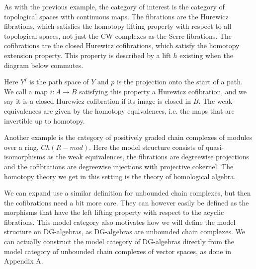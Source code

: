 \begin{example}
As with the previous example, the category of interest is the category of topological spaces with continuous maps. The fibrations are the Hurewicz fibrations, which satisfies the homotopy lifting property with respect to all topological spaces, not just the CW complexes as the Serre fibrations. The cofibrations are the closed Hurewicz cofibrations, which satisfy the homotopy extension property. This property is described by a lift $h$ existing when the diagram below commutes.

\begin{center}
\end{center}

Here $Y^I$ is the path space of $Y$ and $p$ is the projection onto the start of a path. We call a map $i:A\longrightarrow B$ satisfying this property a Hurewicz cofibration, and we say it is a closed Hurewicz cofibration if its image is closed in $B$. The weak equivalences are given by the homotopy equivalences, i.e. the maps that are invertible up to homotopy.  
\end{example}

\begin{example}
Another example is the category of positively graded chain complexes of modules over a ring, $Ch(R-mod)$. Here the model structure consists of quasi-isomorphisms as the weak equivalences, the fibrations are degreewise projections and the cofibrations are degreewise injections with projective cokernel. The homotopy theory we get in this setting is the theory of homological algebra. 

We can expand use a similar definition for unbounded chain complexes, but then the cofibrations need a bit more care. They can however easily be defined as the morphisms that have the left lifting property with respect to the acyclic fibrations. This model category also motivates how we will define the model structure on DG-algebras, as DG-algebras are unbounded chain complexes. We can actually construct the model category of DG-algebras directly from the model category of unbounded chain complexes of vector spaces, as done in Appendix A.
\label{ex:chain_complexes}
\end{example}



